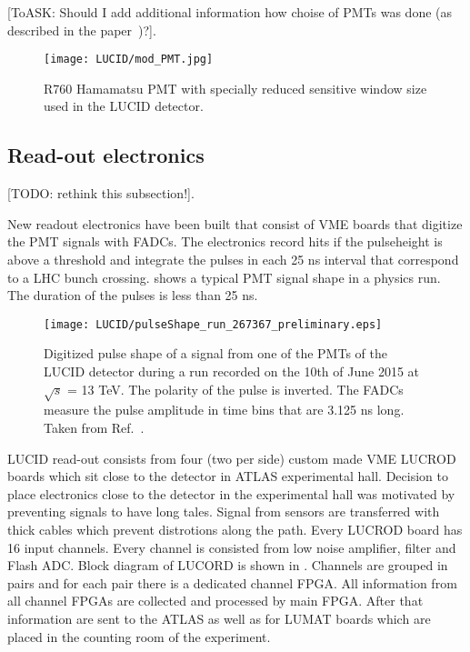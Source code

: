 [ToASK: Should I add additional information how choise of PMTs was done (as described in the paper~\cite{Alberghi:2016tad})?].

\begin{figure}
\centering
\texttt{[image: LUCID/mod\_PMT.jpg]}
\caption{R760 Hamamatsu PMT with specially reduced sensitive window size used in the LUCID detector.}
\label{fig:modPMT}
\end{figure}


\subsection{Read-out electronics}
\label{subsec:LUCIDElectronics}

[TODO: rethink this subsection!].

New readout electronics have been built that consist of VME boards that digitize the PMT signals with FADCs. 
The electronics record hits if the pulseheight is above a threshold and integrate the pulses in each 25 ns 
interval that correspond to a LHC bunch crossing.  shows a typical PMT signal shape in 
a physics run. The duration of the pulses is less than 25 ns.

\begin{figure}
\centering
\texttt{[image: LUCID/pulseShape\_run\_267367\_preliminary.eps]}
\caption{Digitized pulse shape of a signal from one of the PMTs of the LUCID detector during a run recorded on 
the 10th of June 2015 at $\sqrt{s}$ = 13 TeV. The polarity of the pulse is inverted. The FADCs measure the 
pulse amplitude in time bins that are 3.125 ns long. Taken from Ref.~\cite{publicPlots}.}
\label{fig:pulseShape}
\end{figure}

LUCID read-out consists from four (two per side) custom made VME LUCROD boards which sit close to the detector in ATLAS experimental hall.
Decision to place electronics close to the detector in the experimental hall was motivated by preventing signals to have long tales.
Signal from sensors are transferred with thick cables which prevent distrotions along the path.
Every LUCROD board has 16 input channels. Every channel is consisted from low noise amplifier, filter and Flash ADC.
Block diagram of LUCORD is shown in .
Channels are grouped in pairs and for each pair there is a dedicated channel FPGA.
All information from all channel FPGAs are collected and processed by main FPGA.
After that information are sent to the ATLAS as well as for LUMAT boards which are placed in the counting room of the experiment.

